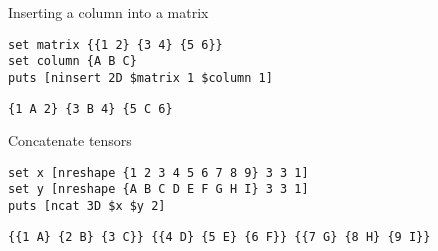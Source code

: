 \begin{example}{Inserting a column into a matrix}
\begin{lstlisting}
set matrix {{1 2} {3 4} {5 6}}
set column {A B C}
puts [ninsert 2D $matrix 1 $column 1]
\end{lstlisting}
\tcblower
\begin{lstlisting}
{1 A 2} {3 B 4} {5 C 6}
\end{lstlisting}
\end{example}
\begin{example}{Concatenate tensors}
\begin{lstlisting}
set x [nreshape {1 2 3 4 5 6 7 8 9} 3 3 1]
set y [nreshape {A B C D E F G H I} 3 3 1]
puts [ncat 3D $x $y 2]
\end{lstlisting}
\tcblower
\begin{lstlisting}
{{1 A} {2 B} {3 C}} {{4 D} {5 E} {6 F}} {{7 G} {8 H} {9 I}}
\end{lstlisting}
\end{example}

\clearpage
